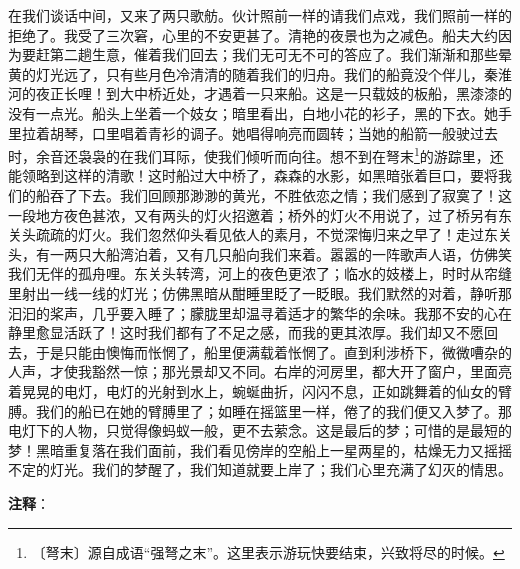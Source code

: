 \documentclass[12pt,UTF-8,openany]{ctexbook}
\begin{document}
\begin{normalsize}
    在我们谈话中间，又来了两只歌舫。伙计照前一样的请我们点戏，我们照前一样的拒绝了。我受了三次窘，心里的不安更甚了。清艳的夜景也为之减色。船夫大约因为要赶第二趟生意，催着我们回去；我们无可无不可的答应了。我们渐渐和那些晕黄的灯光远了，只有些月色冷清清的随着我们的归舟。我们的船竟没个伴儿，秦淮河的夜正长哩！到大中桥近处，才遇着一只来船。这是一只载妓的板船，黑漆漆的没有一点光。船头上坐着一个妓女；暗里看出，白地小花的衫子，黑的下衣。她手里拉着胡琴，口里唱着青衫的调子。她唱得响亮而圆转；当她的船箭一般驶过去时，余音还袅袅的在我们耳际，使我们倾听而向往。想不到在弩末\footnote{〔弩末〕源自成语“强弩之末”。这里表示游玩快要结束，兴致将尽的时候。}的游踪里，还能领略到这样的清歌！这时船过大中桥了，森森的水影，如黑暗张着巨口，要将我们的船吞了下去。我们回顾那渺渺的黄光，不胜依恋之情；我们感到了寂寞了！这一段地方夜色甚浓，又有两头的灯火招邀着；桥外的灯火不用说了，过了桥另有东关头疏疏的灯火。我们忽然仰头看见依人的素月，不觉深悔归来之早了！走过东关头，有一两只大船湾泊着，又有几只船向我们来着。嚣嚣的一阵歌声人语，仿佛笑我们无伴的孤舟哩。东关头转湾，河上的夜色更浓了；临水的妓楼上，时时从帘缝里射出一线一线的灯光；仿佛黑暗从酣睡里眨了一眨眼。我们默然的对着，静听那汩汩的桨声，几乎要入睡了；朦胧里却温寻着适才的繁华的余味。我那不安的心在静里愈显活跃了！这时我们都有了不足之感，而我的更其浓厚。我们却又不愿回去，于是只能由懊悔而怅惘了，船里便满载着怅惘了。直到利涉桥下，微微嘈杂的人声，才使我豁然一惊；那光景却又不同。右岸的河房里，都大开了窗户，里面亮着晃晃的电灯，电灯的光射到水上，蜿蜒曲折，闪闪不息，正如跳舞着的仙女的臂膊。我们的船已在她的臂膊里了；如睡在摇篮里一样，倦了的我们便又入梦了。那电灯下的人物，只觉得像蚂蚁一般，更不去萦念。这是最后的梦；可惜的是最短的梦！黑暗重复落在我们面前，我们看见傍岸的空船上一星两星的，枯燥无力又摇摇不定的灯光。我们的梦醒了，我们知道就要上岸了；我们心里充满了幻灭的情思。
    
\end{normalsize}


\newpage

\textbf{注释}：

\vspace{-1em}
\end{document}
